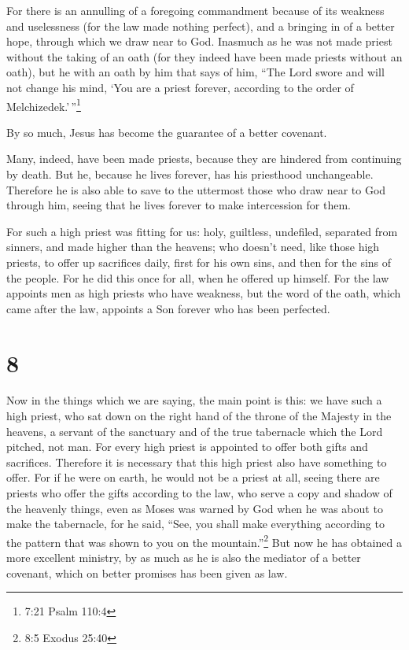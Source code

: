  For there is an annulling of a foregoing commandment
because of its weakness and uselessness  (for the law made
nothing perfect), and a bringing in of a better hope, through which we
draw near to God.  Inasmuch as he was not made priest
without the taking of an oath  (for they indeed have been
made priests without an oath), but he with an oath by him that says of
him, ``The Lord swore and will not change his mind, `You are a priest
forever, according to the order of Melchizedek.'\,''\footnote{7:21 Psalm
  110:4}

 By so much, Jesus has become the guarantee of a better
covenant.

 Many, indeed, have been made priests, because they are
hindered from continuing by death.  But he, because he
lives forever, has his priesthood unchangeable.  Therefore
he is also able to save to the uttermost those who draw near to God
through him, seeing that he lives forever to make intercession for them.

 For such a high priest was fitting for us: holy,
guiltless, undefiled, separated from sinners, and made higher than the
heavens;  who doesn't need, like those high priests, to
offer up sacrifices daily, first for his own sins, and then for the sins
of the people. For he did this once for all, when he offered up himself.
 For the law appoints men as high priests who have
weakness, but the word of the oath, which came after the law, appoints a
Son forever who has been perfected.

\hypertarget{section-7}{%
\section{8}\label{section-7}}

 Now in the things which we are saying, the main point is
this: we have such a high priest, who sat down on the right hand of the
throne of the Majesty in the heavens,  a servant of the
sanctuary and of the true tabernacle which the Lord pitched, not man.
 For every high priest is appointed to offer both gifts and
sacrifices. Therefore it is necessary that this high priest also have
something to offer.  For if he were on earth, he would not
be a priest at all, seeing there are priests who offer the gifts
according to the law,  who serve a copy and shadow of the
heavenly things, even as Moses was warned by God when he was about to
make the tabernacle, for he said, ``See, you shall make everything
according to the pattern that was shown to you on the
mountain.''\footnote{8:5 Exodus 25:40}  But now he has
obtained a more excellent ministry, by as much as he is also the
mediator of a better covenant, which on better promises has been given
as law.

